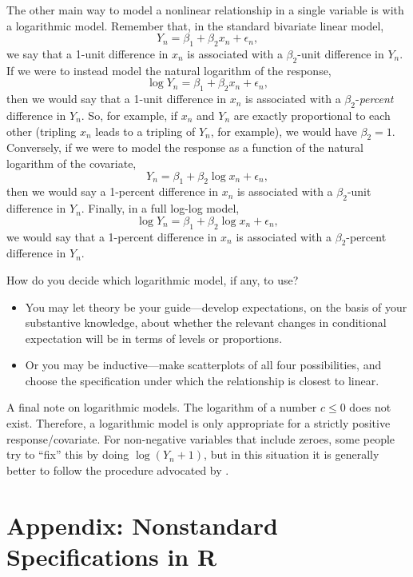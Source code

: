 \documentclass[12pt,oneside,openany]{book}
\begin{document}
The other main way to model a nonlinear relationship in a single
variable is with a logarithmic model. Remember that, in the standard
bivariate linear model, \[
Y_n = \beta_1 + \beta_2 x_n + \epsilon_n,
\] we say that a 1-unit difference in \(x_n\) is associated with a
\(\beta_2\)-unit difference in \(Y_n\). If we were to instead model the
natural logarithm of the response, \[
\log Y_n = \beta_1 + \beta_2 x_n + \epsilon_n,
\] then we would say that a 1-unit difference in \(x_n\) is associated
with a \(\beta_2\)-\emph{percent} difference in \(Y_n\). So, for
example, if \(x_n\) and \(Y_n\) are exactly proportional to each other
(tripling \(x_n\) leads to a tripling of \(Y_n\), for example), we would
have \(\beta_2 = 1\). Conversely, if we were to model the response as a
function of the natural logarithm of the covariate, \[
Y_n = \beta_1 + \beta_2 \log x_n + \epsilon_n,
\] then we would say a 1-percent difference in \(x_n\) is associated
with a \(\beta_2\)-unit difference in \(Y_n\). Finally, in a full
log-log model, \[
\log Y_n = \beta_1 + \beta_2 \log x_n + \epsilon_n,
\] we would say that a 1-percent difference in \(x_n\) is associated
with a \(\beta_2\)-percent difference in \(Y_n\).

How do you decide which logarithmic model, if any, to use?

\begin{itemize}
\item
  You may let theory be your guide---develop expectations, on the basis
  of your substantive knowledge, about whether the relevant changes in
  conditional expectation will be in terms of levels or proportions.
\item
  Or you may be inductive---make scatterplots of all four possibilities,
  and choose the specification under which the relationship is closest
  to linear.
\end{itemize}

A final note on logarithmic models. The logarithm of a number
\(c \leq 0\) does not exist. Therefore, a logarithmic model is only
appropriate for a strictly positive response/covariate. For non-negative
variables that include zeroes, some people try to ``fix'' this by doing
\(\log(Y_n + 1)\), but in this situation it is generally better to
follow the procedure advocated by \citet{burbidge1988alternative}.

\section{Appendix: Nonstandard Specifications in
R}\label{appendix-nonstandard-specifications-in-r}
\end{document}

